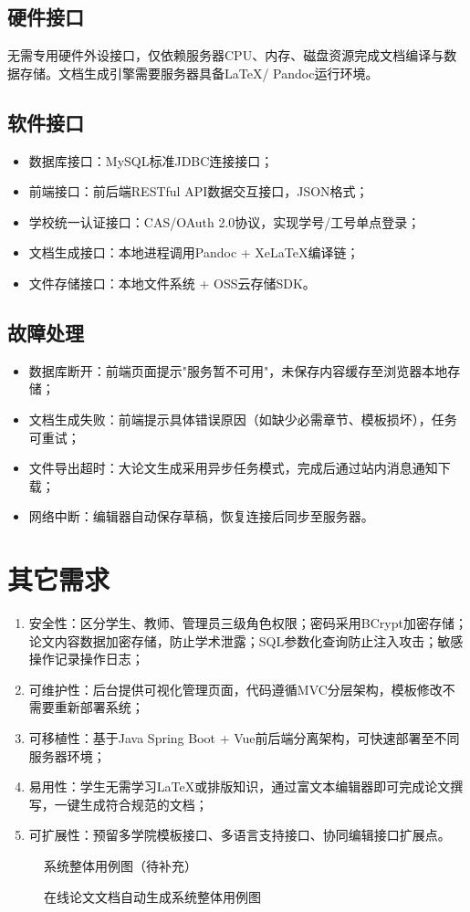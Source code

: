\documentclass{../template/softeng}
\begin{document}
\subsection{硬件接口}
无需专用硬件外设接口，仅依赖服务器CPU、内存、磁盘资源完成文档编译与数据存储。文档生成引擎需要服务器具备LaTeX/ Pandoc运行环境。

\subsection{软件接口}
\begin{itemize}
    \item 数据库接口：MySQL标准JDBC连接接口；
    \item 前端接口：前后端RESTful API数据交互接口，JSON格式；
    \item 学校统一认证接口：CAS/OAuth 2.0协议，实现学号/工号单点登录；
    \item 文档生成接口：本地进程调用Pandoc + XeLaTeX编译链；
    \item 文件存储接口：本地文件系统 + OSS云存储SDK。
\end{itemize}

\subsection{故障处理}
\begin{itemize}
    \item 数据库断开：前端页面提示"服务暂不可用"，未保存内容缓存至浏览器本地存储；
    \item 文档生成失败：前端提示具体错误原因（如缺少必需章节、模板损坏），任务可重试；
    \item 文件导出超时：大论文生成采用异步任务模式，完成后通过站内消息通知下载；
    \item 网络中断：编辑器自动保存草稿，恢复连接后同步至服务器。
\end{itemize}

\section{其它需求}
\begin{enumerate}
    \item 安全性：区分学生、教师、管理员三级角色权限；密码采用BCrypt加密存储；论文内容数据加密存储，防止学术泄露；SQL参数化查询防止注入攻击；敏感操作记录操作日志；
    \item 可维护性：后台提供可视化管理页面，代码遵循MVC分层架构，模板修改不需要重新部署系统；
    \item 可移植性：基于Java Spring Boot + Vue前后端分离架构，可快速部署至不同服务器环境；
    \item 易用性：学生无需学习LaTeX或排版知识，通过富文本编辑器即可完成论文撰写，一键生成符合规范的文档；
    \item 可扩展性：预留多学院模板接口、多语言支持接口、协同编辑接口扩展点。
\end{enumerate}

\begin{figure}[htbp]
    \centering
    系统整体用例图（待补充）
    \caption{在线论文文档自动生成系统整体用例图}
\end{figure}
\end{document}
